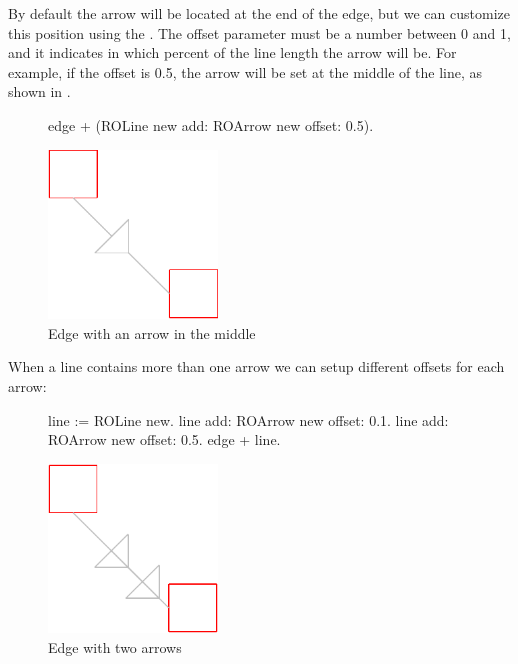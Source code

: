 \documentclass[a4paper,10pt,twoside]{book}
\begin{document}
By default the arrow will be located at the end of the edge, but we can customize this position using the . The offset parameter must be a number between 0 and 1, and it indicates in which percent of the line length the arrow will be. For example, if the offset is 0.5, the arrow will be set at the middle of the line, as shown in .

\begin{figure}[H]
      \begin{minipage}[t]{0.5\textwidth}
      \vspace{0pt}
     \begin{code}{}
edge + (ROLine new add: ROArrow new offset: 0.5). \end{code}
   \end{minipage}
   \hfill
   \begin{minipage}[t]{0.4\textwidth}
      \vspace{0pt} \raggedright
       \centering
		\includegraphics[width=0.4\textwidth]{arrowMiddleEdge}
   \end{minipage}
\caption{Edge with an arrow in the middle}
\label{fig:arrowMiddleEdge}
\end{figure} 

When a line contains more than one arrow we can setup different offsets for each arrow:

\begin{figure}[H]
      \begin{minipage}[t]{0.5\textwidth}
      \vspace{0pt}
     \begin{code}{}
line := ROLine new.
line add: ROArrow new offset: 0.1.
line add: ROArrow new offset: 0.5.
edge + line. \end{code}
   \end{minipage}
   \hfill
   \begin{minipage}[t]{0.4\textwidth}
      \vspace{0pt} \raggedright
       \centering
		\includegraphics[width=0.4\textwidth]{twoArrowEdge}
   \end{minipage}
\caption{Edge with two arrows}
\label{fig:twoArrowEdge}
\end{figure} 
\end{document}

